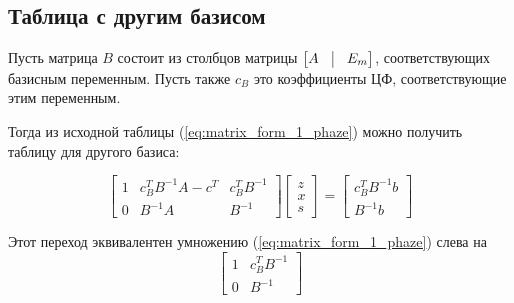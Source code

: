 \documentclass[a4paper,article,14pt]{extarticle}
\begin{document}
%
%
%

\subsection{Таблица с другим базисом}

Пусть матрица \(B\) состоит из столбцов матрицы \(
    \begin{bmatrix}
        A & \vline & E_m
    \end{bmatrix}
\), соответствующих базисным переменным.
Пусть также \(c_B\) это коэффициенты ЦФ, соответствующие этим переменным.

Тогда из исходной таблицы (\ref{eq:matrix_form_1_phaze}) можно получить таблицу для другого базиса:

\begin{equation} \label{eq:matrix_form_1_phaze_basis}
    \begin{bmatrix}
        1 & c_B^TB^{-1}A-c^T & c_B^TB^{-1} \\
        0 & B^{-1}A & B^{-1}
    \end{bmatrix}
    \begin{bmatrix}
        z \\ x \\ s
    \end{bmatrix}
    =
    \begin{bmatrix}
        c_B^TB^{-1}b \\ B^{-1}b
    \end{bmatrix}
\end{equation}

Этот переход эквивалентен умножению (\ref{eq:matrix_form_1_phaze}) слева на
\begin{equation}
    \begin{bmatrix}
        1 & c_B^TB^{-1} \\
        0 & B^{-1}
    \end{bmatrix}
\end{equation}
\end{document}
